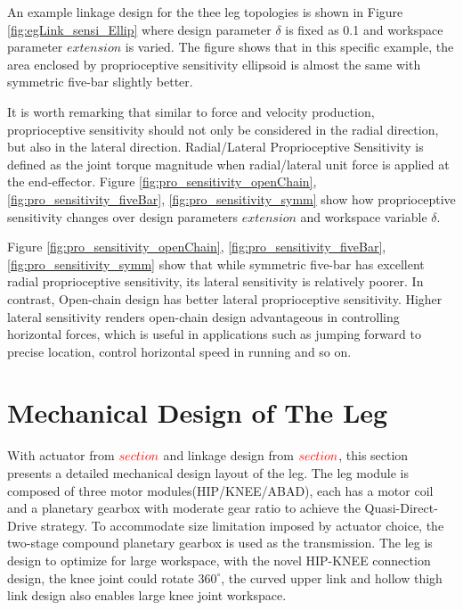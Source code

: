 	An example linkage design for the thee leg topologies is shown in Figure \ref{fig:egLink_sensi_Ellip} where design parameter $\delta$ is fixed as 0.1 and workspace parameter $extension$ is varied. The figure shows that in this specific example, the area enclosed by proprioceptive sensitivity ellipsoid is almost the same with symmetric five-bar slightly better.

	It is worth remarking that similar to force and velocity production, proprioceptive sensitivity should not only be considered in the radial direction, but also in the lateral direction. Radial/Lateral Proprioceptive Sensitivity is defined as the joint torque magnitude when radial/lateral unit force is applied at the end-effector. Figure \ref{fig:pro_sensitivity_openChain}, \ref{fig:pro_sensitivity_fiveBar}, \ref{fig:pro_sensitivity_symm} show how proprioceptive sensitivity changes over design parameters $extension$ and workspace variable $\delta$.
	
	Figure \ref{fig:pro_sensitivity_openChain}, \ref{fig:pro_sensitivity_fiveBar}, \ref{fig:pro_sensitivity_symm} show that while symmetric five-bar has excellent radial proprioceptive sensitivity, its lateral sensitivity is relatively poorer. In contrast, Open-chain design has better lateral proprioceptive sensitivity. Higher lateral sensitivity renders open-chain design advantageous in controlling horizontal forces, which is useful in applications such as jumping forward to precise location, control horizontal speed in running and so on.
	



\section{Mechanical Design of The Leg}
\label{sec:LegDesign}

With actuator from $\color{red}section$ and linkage design from $\color{red}section$, this section presents a detailed mechanical design layout of the leg. The leg module is composed of three motor modules(HIP/KNEE/ABAD), each has a motor coil and a planetary gearbox with moderate gear ratio to achieve the Quasi-Direct-Drive\cite{20162016} strategy. To accommodate size limitation imposed by actuator choice, the two-stage compound planetary gearbox is used as the transmission. The leg is design to optimize for large workspace, with the novel HIP-KNEE connection design, the knee joint could rotate $360^{\circ}$, the curved upper link and hollow thigh link design also enables large knee joint workspace.
  
